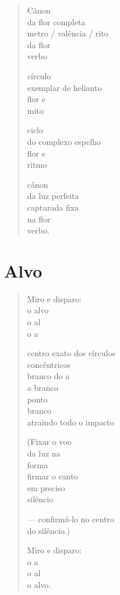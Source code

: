 \begin{verse}
Cânon\\
da flor completa\\
metro / valência / rito\\
da flor\\
verbo

círculo\\
exemplar de helianto\\
flor e\\
mito

ciclo\\
do complexo espelho\\
flor e\\
ritmo

cânon\\
da luz perfeita\\
capturada fixa\\
na flor\\
verbo.
\end{verse}

\chapter{Alvo}

\begin{verse}
Miro e disparo:\\
o alvo\\
o al\\
o a

centro exato dos círculos\\
concêntricos\\
branco do a\\
a branco\\
\quad{}ponto\\
\quad{}branco\\
atraindo todo o impacto

(Fixar o voo\\
da luz na\\
\quad{}forma\\
firmar o canto\\
em preciso\\
silêncio

--- confirmá-lo no centro\\
\quad\quad\quad{}do silêncio.)

Miro e disparo:\\
o a\\
o al\\
o alvo.
\end{verse}

